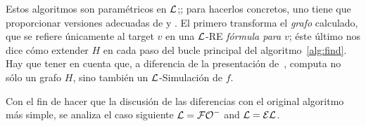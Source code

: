 {Estos algoritmos son param\'etricos en $\mathcal{L}$;; para hacerlos concretos, uno
tiene que proporcionar versiones adecuadas de  y
. El primero transforma el {\em grafo} calculado, que se refiere \'unicamente al target $v$ en una $\mathcal{L}$-RE {\em
f\'ormula para} $v$; \'este \'ultimo nos dice c\'omo extender $H$ en cada paso
del bucle principal del algoritmo~\ref{alg:find}. Hay que tener en cuenta que, a diferencia de la
presentaci\'on de~\cite{Krahmer2003},  computa
no sólo un grafo $H$, sino tambi\'en un $\mathcal{L}$-Simulación de $f$.

%
%
%
%
%
%
%
%
%

Con el fin de hacer que la discusi\'on de las diferencias con el original
algoritmo m\'as simple, se analiza el caso siguiente $\mathcal{L}={\mathcal{FO}^-}$ and $\mathcal{L}=\mathcal{EL}$.

%
%
}
